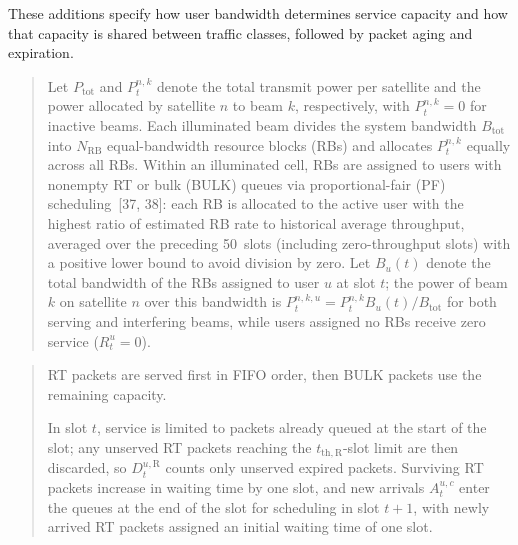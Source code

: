 \documentclass[11pt,a4paper]{article}
\newcommand{\qrev}[1]{{\color{qinrev}#1}}
\begin{document}
These additions specify how user bandwidth determines service capacity and how that capacity is shared between traffic classes, followed by packet aging and expiration.
\par


\begin{quote}\small\color{revisionblue}
\qrev{Let $P_{\mathrm{tot}}$ and $P_t^{n,k}$ denote the total transmit power per satellite and the power allocated by satellite $n$ to beam $k$, respectively, with $P_t^{n,k}=0$ for inactive beams. Each illuminated beam divides the system bandwidth $B_{\mathrm{tot}}$ into $N_{\mathrm{RB}}$ equal-bandwidth resource blocks (RBs) and allocates $P_t^{n,k}$ equally across all RBs. Within an illuminated cell, RBs are assigned to users with nonempty RT or bulk (BULK) queues via proportional-fair (PF) scheduling~[37, 38]: each RB is allocated to the active user with the highest ratio of estimated RB rate to historical average throughput, averaged over the preceding 50~slots (including zero-throughput slots) with a positive lower bound to avoid division by zero. Let $B_u(t)$ denote the total bandwidth of the RBs assigned to user $u$ at slot $t$; the power of beam $k$ on satellite $n$ over this bandwidth is $P_t^{n,k,u}=P_t^{n,k}B_u(t)/B_{\mathrm{tot}}$ for both serving and interfering beams, while users assigned no RBs receive zero service ($R_t^u=0$).}
\par
\end{quote}


\begin{quote}\small\color{revisionblue}
RT packets are served first in FIFO order, then BULK packets use the remaining capacity.
\par

\qrev{In slot $t$, service is limited to packets already queued at the start of the slot; any unserved RT packets reaching the $t_{\mathrm{th},\mathrm{R}}$-slot limit are then discarded, so $D_t^{u,\mathrm{R}}$ counts only unserved expired packets. Surviving RT packets increase in waiting time by one slot, and new arrivals $A_t^{u,c}$ enter the queues at the end of the slot for scheduling in slot $t+1$, with newly arrived RT packets assigned an initial waiting time of one slot.}
\par
\end{quote}
\end{document}
